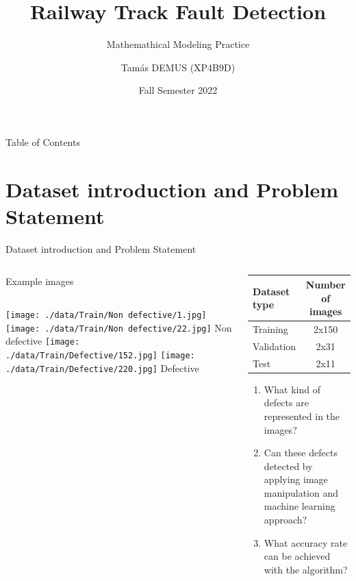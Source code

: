 \documentclass[aspectratio=169]{beamer}
\title{Railway Track Fault Detection}
\subtitle{Mathemathical Modeling Practice}
\author{Tamás DEMUS (XP4B9D)}
\date{Fall Semester 2022}
\begin{document}
\maketitle

\begin{frame}{Table of Contents}
    \tableofcontents
\end{frame}

\section{Dataset introduction and Problem Statement}
\begin{frame}{Dataset introduction and Problem Statement}
    \begin{columns}[c]
        \begin{exampleblock}{Example images}
            \begin{columns}[c]
                \texttt{[image: ./data/Train/Non defective/1.jpg]}
                \texttt{[image: ./data/Train/Non defective/22.jpg]}
                \centering
                Non defective
                \texttt{[image: ./data/Train/Defective/152.jpg]}
                \texttt{[image: ./data/Train/Defective/220.jpg]}
                \centering
                Defective
            \end{columns}
        \end{exampleblock}
        \pause
        \begin{block}{}
            \begin{table}[!ht]
                \begin{tabular}{l c}
                    Dataset type & Number of images \\
                    \hline
                    Training     & 2x150            \\
                    Validation   & 2x31             \\
                    Test         & 2x11             \\
                \end{tabular}
            \end{table}
            \pause
            \begin{enumerate}[label=Q\arabic*]
                \item \label{itm:Q1} What kind of defects are represented in the images?
                \item \label{itm:Q2} Can these defects detected by applying image manipulation
                      and machine learning approach?
                \item \label{itm:Q3} What accuracy rate can be achieved with the algorithm?
            \end{enumerate}
        \end{block}
    \end{columns}
\end{frame}
\end{document}
